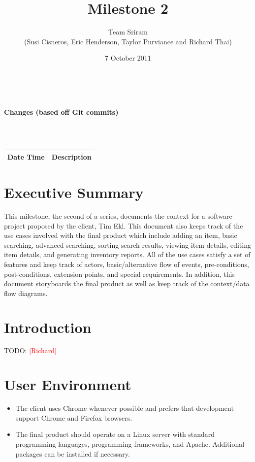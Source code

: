 \documentclass{article}
\newcommand{\richard}{\textcolor{red}{[Richard]}}
\begin{document}
\setlength{\voffset}{3.5in}
\title{Milestone 2}
\author{Team Sriram\\
(Susi Cisneros, Eric Henderson, Taylor Purviance and Richard Thai)}
\date{7 October 2011}
\maketitle
\clearpage
\setlength{\voffset}{0pt}
\tableofcontents
\clearpage
~\\
\begin{Large}\textbf{Changes (based off Git commits)}\end{Large}\\
~\\
\begin{tabular}{ | p{2in} | p{4.5in} | }
\hline
\textbf{Date Time} & \textbf{Description}\\
\hline
\hline
\end{tabular}
\clearpage

\section{Executive Summary}
This milestone, the second of a series, documents the context for a software project proposed by the client, Tim Ekl. This document also keeps track of the use cases involved with the final product which include adding an item, basic searching, advanced searching, sorting search results, viewing item details, editing item details, and generating inventory reports. All of the use cases satisfy a set of features and keep track of actors, basic/alternative flow of events, pre-conditions, post-conditions, extension points, and special requirements. In addition, this document storyboards the final product as well as keep track of the context/data flow diagrams.

\section{Introduction}
TODO: \richard

\section{User Environment}
\begin{itemize}
\item The client uses Chrome whenever possible and prefers that development support Chrome and Firefox browsers.
\item The final product should operate on a Linux server with standard programming languages, programming frameworks, and Apache.  Additional packages can be installed if necessary.
\end{itemize}
\end{document}
